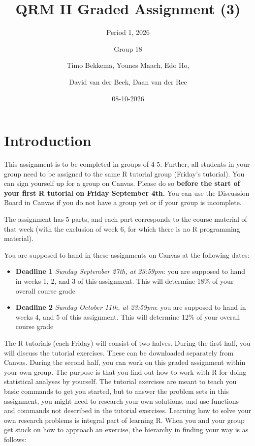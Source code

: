 \documentclass[
]{article}
\title{QRM II Graded Assignment (3)}
\subtitle{Period 1, 2026}
\author{Group 18 \and Timo Bekkema, Younes Maach, Edo Ho, \and David van
der Beek, Daan van der Ree}
\date{08-10-2026}
\providecommand{\tightlist}{%
  \setlength{\itemsep}{0pt}\setlength{\parskip}{0pt}}
\begin{document}
\maketitle

\section{Introduction}\label{introduction}

This assignment is to be completed in groups of 4-5. Further, all
students in your group need to be assigned to the same R tutorial group
(Friday's tutorial). You can sign yourself up for a group on Canvas.
Please do so
\textbf{before the start of your first R tutorial on Friday September 4th.}
You can use the Discussion Board in Canvas if you do not have a group
yet or if your group is incomplete.

The assignment has 5 parts, and each part corresponds to the course
material of that week (with the exclusion of week 6, for which there is
no R programming material).

You are supposed to hand in these assignments on Canvas at the following
dates:

\begin{itemize}
\tightlist
\item
  \textbf{Deadline 1} \emph{Sunday September 27th, at 23:59pm}: you are
  supposed to hand in weeks 1, 2, and 3 of this assignment. This will
  determine 18\% of your overall course grade
\item
  \textbf{Deadline 2} \emph{Sunday October 11th, at 23:59pm}: you are
  supposed to hand in weeks 4, and 5 of this assignment. This will
  determine 12\% of your overall course grade
\end{itemize}

The R tutorials (each Friday) will consist of two halves. During the
first half, you will discuss the tutorial exercises. These can be
downloaded separately from Canvas. During the second half, you can work
on this graded assignment within your own group. The purpose is that you
find out how to work with R for doing statistical analyses by yourself.
The tutorial exercises are meant to teach you basic commands to get you
started, but to answer the problem sets in this assignment, you might
need to research your own solutions, and use functions and commands not
described in the tutorial exercises. Learning how to solve your own
research problems is integral part of learning R. When you and your
group get stuck on how to approach an exercise, the hierarchy in finding
your way is as follows:
\end{document}
